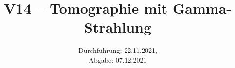 \title{V14 – Tomographie mit Gamma-Strahlung}
\date{Durchführung: 22.11.2021, \\ Abgabe: 07.12.2021}
